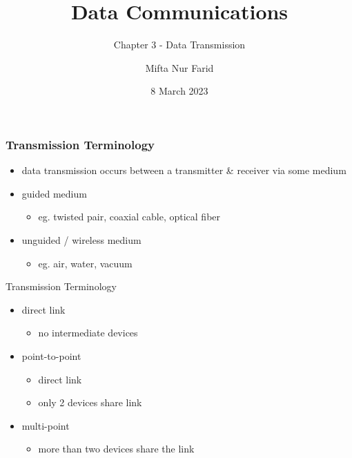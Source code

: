 \documentclass[pdflatex,compress]{beamer}
\title{Data Communications}
\subtitle{Chapter 3 - Data Transmission}
\author{Mifta Nur Farid}
\date{8 March 2023}
\begin{document}
\maketitle

\begin{frame}
	\frametitle{Transmission Terminology}
	\begin{itemize}
		\item data transmission occurs between a transmitter \& receiver via some medium
		\item guided medium
		\begin{itemize}
			\item eg. twisted pair, coaxial cable, optical fiber
		\end{itemize}
		\item unguided / wireless medium
		\begin{itemize}
			\item eg. air, water, vacuum
		\end{itemize}
	\end{itemize}
\end{frame}

\begin{frame}{Transmission Terminology}
	\begin{itemize}
		\item direct link
		\begin{itemize}
			\item no intermediate devices
		\end{itemize}
		\item point-to-point
		\begin{itemize}
			\item direct link 
			\item only 2 devices share link
		\end{itemize}
		\item multi-point
		\begin{itemize}
			\item more than two devices share the link
		\end{itemize}
	\end{itemize}
\end{frame}
\end{document}
